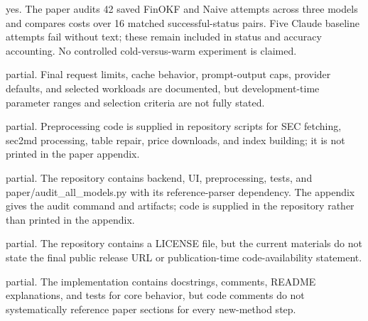 \documentclass[letterpaper]{article}
\begin{document}
\begin{itemize}

yes. The paper audits 42 saved FinOKF and Naive attempts across three models and compares costs over 16 matched successful-status pairs. Five Claude baseline attempts fail without text; these remain included in status and accuracy accounting. No controlled cold-versus-warm experiment is claimed.

\begin{itemize}

	partial. Final request limits, cache behavior, prompt-output caps, provider defaults, and selected workloads are documented, but development-time parameter ranges and selection criteria are not fully stated.

	partial. Preprocessing code is supplied in repository scripts for SEC fetching, sec2md processing, table repair, price downloads, and index building; it is not printed in the paper appendix.

	partial. The repository contains backend, UI, preprocessing, tests, and paper/audit\_all\_models.py with its reference-parser dependency. The appendix gives the audit command and artifacts; code is supplied in the repository rather than printed in the appendix.

	partial. The repository contains a LICENSE file, but the current materials do not state the final public release URL or publication-time code-availability statement.
        
	partial. The implementation contains docstrings, comments, README explanations, and tests for core behavior, but code comments do not systematically reference paper sections for every new-method step.


\end{itemize}
\end{itemize}
\end{document}

